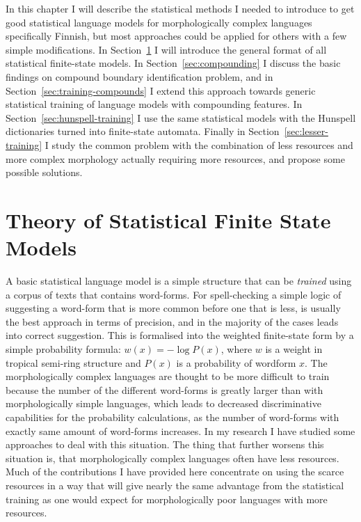 \documentclass[officiallayout]{unihelcompling}
\begin{document}
In this chapter I will describe the statistical methods I needed to introduce
to get good statistical language models for morphologically complex languages
specifically Finnish, but most approaches could be applied for others with a
few simple modifications. In Section~\ref{sec:statistical} I will introduce the
general format of all statistical finite-state models.  In
Section~\ref{sec:compounding} I discuss the basic findings on compound boundary
identification problem, and in Section~\ref{sec:training-compounds} I extend
this approach towards generic statistical training of language models with
compounding features. In Section~\ref{sec:hunspell-training} I use the same
statistical models with the Hunspell dictionaries turned into finite-state
automata. Finally in Section~\ref{sec:lesser-training} I study the common
problem with the combination of less resources and more complex morphology
actually requiring more resources, and propose some possible solutions.

\section{Theory of Statistical Finite State Models}
\label{sec:statistical}

A basic statistical language model is a simple structure that can be
\emph{trained} using a corpus of texts that contains word-forms. For
spell-checking a simple logic of suggesting a word-form that is more common
before one that is less, is usually the best approach in terms of precision,
and in the majority of the cases leads into correct suggestion. This is
formalised into the weighted finite-state form by a simple probability formula:
$w(x) = -\log P(x)$, where $w$ is a weight in tropical semi-ring structure and
$P(x)$ is a probability of wordform $x$.  The morphologically complex languages
are thought to be more difficult to train because the number of the different
word-forms is greatly larger than with morphologically simple languages, which
leads to decreased discriminative capabilities for the probability
calculations, as the number of word-forms with exactly same amount of
word-forms increases. In my research I have studied some approaches to deal
with this situation. The thing that further worsens this situation is, that
morphologically complex languages often have less resources. Much of the
contributions I have provided here concentrate on using the scarce resources in
a way that will give nearly the same advantage from the statistical training as
one would expect for morphologically poor languages with more resources.
\end{document}
